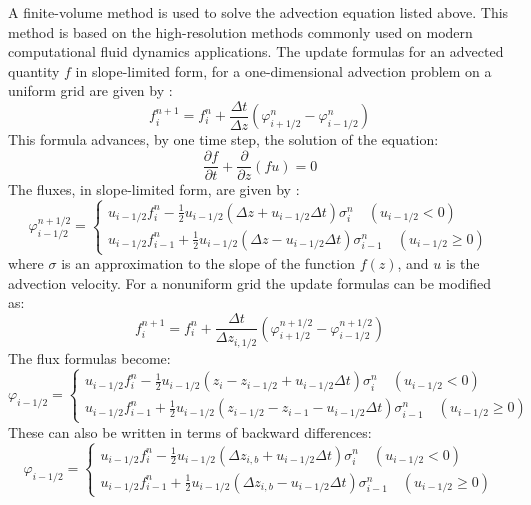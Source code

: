 \documentclass[11pt,letterpaper]{article}
\begin{document}
A finite-volume method is used to solve the advection equation listed above.  This method is based on the high-resolution methods commonly used on modern computational fluid dynamics applications.  The update formulas for an advected quantity $f$ in slope-limited form, for a one-dimensional advection problem on a uniform grid are given by \citet[][ pg. 113]{Leveque:2002}:
\begin{equation}
f_i^{n+1} = f_i^{n} + \frac{\Delta t}{\Delta z} \left( \varphi_{i+1/2}^n - \varphi_{i-1/2}^n \right) 
\end{equation}
This formula advances, by one time step, the solution of the equation:
\begin{equation}
\frac{\partial f}{\partial t} + \frac{\partial}{\partial z} \left( f u \right) = 0
\end{equation}
The fluxes, in slope-limited form, are given by \citep[cf.][]{Leveque:2002}:
\begin{equation}
\varphi_{i-1/2}^{n+1/2} = \left\{ \begin{array}{c} 
u_{i-1/2} f_{i}^n - \frac{1}{2} u_{i-1/2} \left( \Delta z + u_{i-1/2} \Delta t \right) \sigma_i^n \quad (u_{i-1/2}  < 0) \\
u_{i-1/2} f_{i-1}^n + \frac{1}{2} u_{i-1/2} \left( \Delta z - u_{i-1/2} \Delta t \right) \sigma_{i-1}^n \quad (u_{i-1/2}  \ge 0)
\end{array} \right.
\end{equation}
where $\sigma$ is an approximation to the slope of the function $f(z)$, and $u$ is the advection velocity.  For a nonuniform grid the update formulas can be modified as:
\begin{equation}
f_i^{n+1} = f_i^{n} + \frac{\Delta t}{\Delta z_{i,1/2}} \left( \varphi_{i+1/2}^{n+1/2} - \varphi_{i-1/2}^{n+1/2} \right) 
\end{equation}
The flux formulas become:%
\begin{equation}
\varphi_{i-1/2} = \left\{ \begin{array}{c} 
u_{i-1/2} f_{i}^n - \frac{1}{2} u_{i-1/2} \left( z_i - z_{i-1/2} + u_{i-1/2} \Delta t \right) \sigma_i^n \quad (u_{i-1/2}  < 0) \\
u_{i-1/2} f_{i-1}^n + \frac{1}{2} u_{i-1/2} \left( z_{i-1/2} - z_{i-1} - u_{i-1/2} \Delta t \right) \sigma_{i-1}^n \quad (u_{i-1/2}  \ge 0)
\end{array} \right.
\end{equation} 
These can also be written in terms of backward differences:
\begin{equation}
\varphi_{i-1/2} = \left\{ \begin{array}{c} 
u_{i-1/2} f_{i}^n - \frac{1}{2} u_{i-1/2} \left( \Delta z_{i,b} + u_{i-1/2} \Delta t \right) \sigma_i^n \quad (u_{i-1/2}  < 0) \\
u_{i-1/2} f_{i-1}^n + \frac{1}{2} u_{i-1/2} \left( \Delta z_{i,b} - u_{i-1/2} \Delta t \right) \sigma_{i-1}^n \quad (u_{i-1/2}  \ge 0)
\end{array} \right. \label{eqn:fluxes}
\end{equation} 
\end{document}
